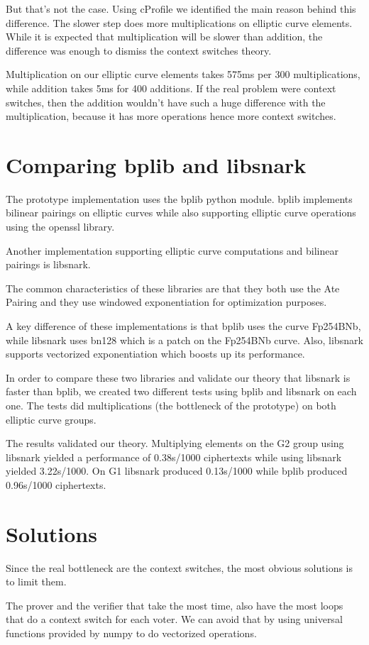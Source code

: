 \documentclass{article}
\begin{document}
But that's not the case. Using cProfile we identified the main
reason behind this difference. The slower step does more multiplications on
elliptic curve elements. While it is expected that multiplication will be slower
than addition, the difference was enough to dismiss the context switches theory.

Multiplication on our elliptic curve elements takes 575ms per 300
multiplications, while addition takes 5ms for 400 additions. If the real
problem were context switches, then the addition wouldn't have such a huge
difference with the multiplication, because it has more operations hence
more context switches.


\section{Comparing bplib and libsnark}

The prototype implementation uses the bplib\cite{bplib} python module.
bplib implements bilinear pairings on elliptic curves while also supporting
elliptic curve operations using the openssl library.

Another implementation supporting elliptic curve computations and bilinear
pairings is libsnark\cite{libsnark}.

The common characteristics of these libraries are that they both use the
Ate Pairing and they use windowed exponentiation for
optimization purposes.

A key difference of these implementations is that bplib uses the
curve Fp254BNb, while libsnark uses bn128 which is a patch on the
Fp254BNb curve. Also, libsnark supports vectorized exponentiation
which boosts up its performance.

In order to compare these two libraries and validate our theory that
libsnark is faster than bplib, we created two different tests
using bplib and libsnark on each one. The tests did multiplications
(the bottleneck of the prototype) on both elliptic curve groups.

The results validated our theory. Multiplying elements on the G2
group using libsnark yielded a performance of 0.38s/1000 ciphertexts
while using libsnark yielded 3.22s/1000. On G1 libsnark produced
0.13s/1000 while bplib produced 0.96s/1000 ciphertexts.


\section{Solutions}

Since the real bottleneck are the context switches, the most obvious
solutions is to limit them. 

The prover and the verifier that take the most time, also have the
most loops that do a context switch for each voter. We can avoid that
by using universal functions provided by numpy\cite{numpy} to do
vectorized operations.




\end{document}
